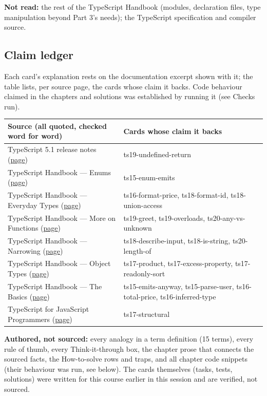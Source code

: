 \documentclass[10pt]{article}
\begin{document}
{\footnotesize\textbf{Not read:} the rest of the TypeScript Handbook (modules, declaration files, type manipulation beyond Part 3's needs); the TypeScript specification and compiler source.}
\subsection*{Claim ledger}
{\footnotesize Each card's explanation rests on the documentation excerpt shown with it; the table lists, per source page, the cards whose claim it backs. Code behaviour claimed in the chapters and solutions was established by running it (see Checks run).}
{\footnotesize\begin{tabularx}{\linewidth}{@{}p{2.2in}X@{}}\toprule
\textbf{Source (all quoted, checked word for word)} & \textbf{Cards whose claim it backs}\\\midrule
TypeScript 5.1 release notes (\href{https://www.typescriptlang.org/docs/handbook/release-notes/typescript-5-1.html}{page}) & ts19-undefined-return\\
TypeScript Handbook — Enums (\href{https://www.typescriptlang.org/docs/handbook/enums.html}{page}) & ts15-enum-emits\\
TypeScript Handbook — Everyday Types (\href{https://www.typescriptlang.org/docs/handbook/2/everyday-types.html}{page}) & ts16-format-price, ts18-format-id, ts18-union-access\\
TypeScript Handbook — More on Functions (\href{https://www.typescriptlang.org/docs/handbook/2/functions.html}{page}) & ts19-greet, ts19-overloads, ts20-any-vs-unknown\\
TypeScript Handbook — Narrowing (\href{https://www.typescriptlang.org/docs/handbook/2/narrowing.html}{page}) & ts18-describe-input, ts18-is-string, ts20-length-of\\
TypeScript Handbook — Object Types (\href{https://www.typescriptlang.org/docs/handbook/2/objects.html}{page}) & ts17-product, ts17-excess-property, ts17-readonly-sort\\
TypeScript Handbook — The Basics (\href{https://www.typescriptlang.org/docs/handbook/2/basic-types.html}{page}) & ts15-emits-anyway, ts15-parse-user, ts16-total-price, ts16-inferred-type\\
TypeScript for JavaScript Programmers (\href{https://www.typescriptlang.org/docs/handbook/typescript-in-5-minutes.html}{page}) & ts17-structural\\
\bottomrule\end{tabularx}}
{\footnotesize\textbf{Authored, not sourced:} every analogy in a term definition (15 terms), every rule of thumb, every Think-it-through box, the chapter prose that connects the sourced facts, the How-to-solve rows and traps, and all chapter code snippets (their behaviour was run, see below). The cards themselves (tasks, tests, solutions) were written for this course earlier in this session and are verified, not sourced.}
\end{document}
